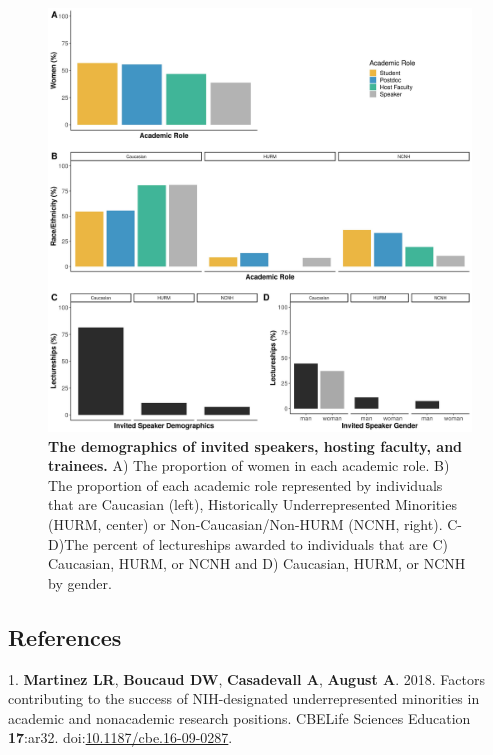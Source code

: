 \documentclass[10pt,]{article}
\begin{document}
\begin{figure}
\centering
\includegraphics{Figure_1.jpg}
\caption{\textbf{The demographics of invited speakers, hosting faculty,
and trainees.} A) The proportion of women in each academic role. B) The
proportion of each academic role represented by individuals that are
Caucasian (left), Historically Underrepresented Minorities (HURM,
center) or Non-Caucasian/Non-HURM (NCNH, right). C-D)The percent of
lectureships awarded to individuals that are C) Caucasian, HURM, or NCNH
and D) Caucasian, HURM, or NCNH by gender.}
\end{figure}

\newpage

\subsection*{References}\label{references}

\hypertarget{refs}{}
\hypertarget{ref-Martinez2018}{}
1. \textbf{Martinez LR}, \textbf{Boucaud DW}, \textbf{Casadevall A},
\textbf{August A}. 2018. Factors contributing to the success of
NIH-designated underrepresented minorities in academic and nonacademic
research positions. CBELife Sciences Education \textbf{17}:ar32.
doi:\href{https://doi.org/10.1187/cbe.16-09-0287}{10.1187/cbe.16-09-0287}.
\end{document}
